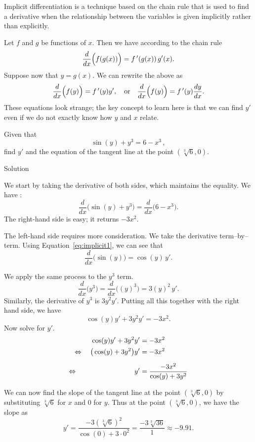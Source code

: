 Implicit differentiation is a technique based on the chain rule that is used to find a derivative when the relationship between the variables is given implicitly rather than explicitly.

Let $f$ and $g$ be functions of $x$. Then we have according to the chain rule
 $$\frac{d}{dx}\Big(f(g(x))\Big) = f\,'(g(x))\, g'(x).$$ 
Suppose now that $y=g(x)$. We can rewrite the above as 
\begin{equation}\frac{d}{dx}\Big(f(y)\Big) = f\,'(y) y', \quad \text{or}\quad \frac{d}{dx}\Big(f(y)\Big)= f\,'(y) \frac{dy}{dx} .\label{eq:implicit1}\end{equation} These equations look strange; the key concept to learn here is that we can find $y'$ even if we do not exactly know how $y$ and $x$ relate.

\begin{example}\label{ex_implicit1}
Given that 
$$\sin(y) + y^3=6-x^3\,,$$
find $y'$ and the equation of the tangent line at the point $(\sqrt[3]6,0)$.

Solution 

We start by taking the derivative of both sides, which maintains the equality. We have :
$$ \frac{d}{dx}\Big(\sin(y) + y^3\Big)=\frac{d}{dx}\Big(6-x^3\Big).$$
The right-hand side is easy; it returns $-3x^2$. 

The left-hand side requires more consideration. We take the derivative term--by--term.  Using Equation~\eqref{eq:implicit1}, we can see that 
$$\frac{d}{dx}\Big(\sin(y)\Big) = \cos(y) \, y'.$$

We apply the same process to the $y^3$ term. 
$$\frac{d}{dx}\Big(y^3\Big) = \frac{d}{dx}\Big((y)^3\Big) = 3(y)^2\, y'.$$
Similarly, the derivative of $y^3$ is $3y^2y'$.  
Putting all this together with the right hand side, we have
$$\cos(y)y'+3y^2y' = -3x^2.$$
Now solve for $y'$.
		\begin{align*}
		\cos(y)y'+3y^2y' 	&= -3x^2\\
		\Leftrightarrow \quad \big(\cos (y)+3y^2\big)y' &=	-3x^2\\[0.2cm]
		\Leftrightarrow \hspace{2.9cm} y'&=	\frac{-3x^2}{\cos (y)+3y^2}
		\end{align*}


We can now find the slope of the tangent line at the point  $(\sqrt[3]6,0)$ by substituting $\sqrt[3]6$ for $x$ and $0$ for $y$. Thus at the point $(\sqrt[3]6,0)$, we have the slope as 
$$y' = \frac{-3(\sqrt[3]{6})^2}{\cos (0) + 3\cdot0^2} = \frac{-3\sqrt[3]{36}}{1} \approx -9.91.$$


\end{example}
